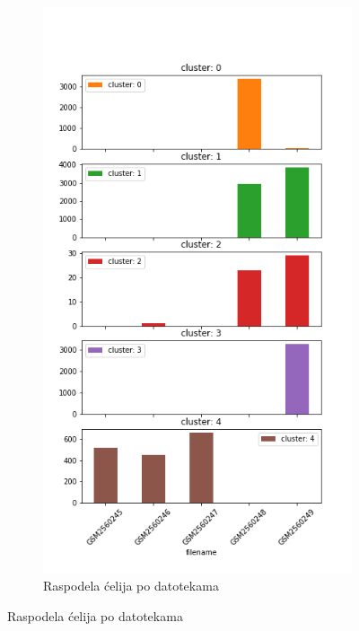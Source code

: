 \documentclass[a4paper]{article}
\begin{document}
\begin{figure}[H]
\begin{subfigure}{0.5\textwidth}
	\includegraphics[width=\textwidth]{spectralClustering_10neighbors_cosineDistance_5clusters}
	\caption{Raspodela ćelija po datotekama}
	\label{file_dist_spektral_nmf_grp1_cosine_bar}
	\end{subfigure}
\end{figure}
\end{document}
